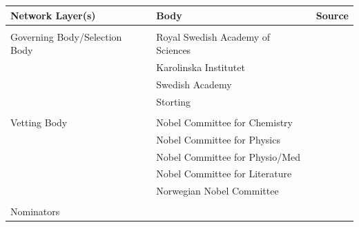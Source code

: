 \documentclass[11pt]{article}
\begin{document}
\begin{table}[t!]
\begin{tabular}{lll}
\textbf{Network Layer(s)}     & \textbf{Body}                       & \textbf{Source}                                                                                                                                    \\ \hline
                              &                                     &                                                                                                                                                    \\
Governing Body/Selection Body & Royal Swedish Academy of Sciences   &  \citet{Ledamotsregister}   \\
                              & Karolinska Institutet               &   \citet{KarolinskaEmployees}             \\
                              & Swedish Academy                     &  \citet{Ledamotsregister}                 \\
                              & Storting                            & \citet{wikidata}                          \\
                              &                                     &                                                                                                                                                    \\
Vetting Body                  & Nobel Committee for Chemistry       & \citet{NobelCommitteeChemistry}  \\
                              & Nobel Committee for Physics         &  \citet{NobelCommitteePhysics}   \\
                              & Nobel Committee for Physio/Med &  \citet{NobelCommitteePhysiology}             \\
                              & Nobel Committee for Literature      &   \citet{Ledamotsregister}              \\
                              & Norwegian Nobel Committee           &  \citet{NorwegianNobelCommittee}                  \\
                              &                                     &                                                                                                                                                    \\
Nominators                    &                                     & \citet{NobelPrizeWebsite}                                                  \\

\end{tabular}
\end{table}
\end{document}
